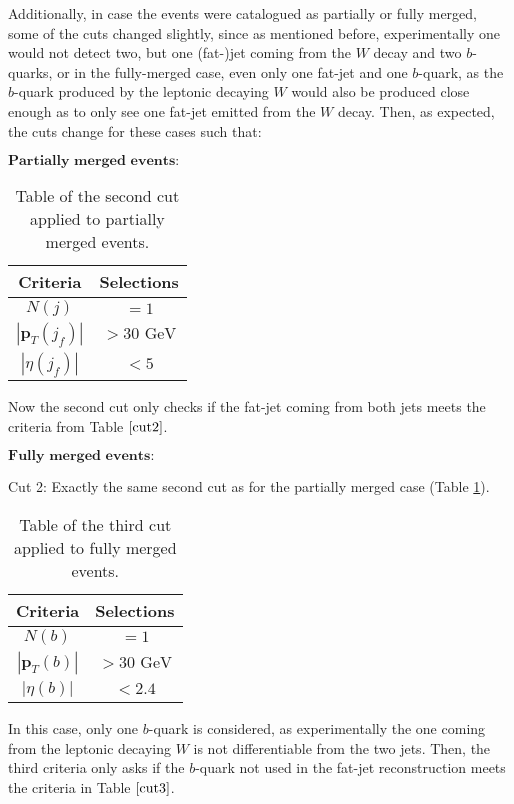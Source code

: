 Additionally, in case the events were catalogued as partially or fully merged, some of the cuts changed slightly, since as mentioned before, experimentally one would not detect two, but one (fat-)jet coming from the $W$ decay and two $b$-quarks, or in the fully-merged case, even only one fat-jet and one $b$-quark, as the $b$-quark produced by the leptonic decaying $W$ would also be produced close enough as to only see one fat-jet emitted from the $W$ decay. Then, as expected, the cuts change for these cases such that:

\vspace{0.2cm}

$\textbf{Partially merged events:}$

\begin{table}[ht!]
\centering
\caption{Table of the second cut applied to partially merged events.}
\label{cut2partially}
\begin{tabular}{cc}
\hline
\hline
 Criteria & Selections \\
\hline
 $N(j)$ & $= 1$ \\
 $|\bm{p}_T(j_f)|$ & $> 30\textrm{ GeV}$ \\
 $|\eta(j_f)|$ & $< 5$  \\
\hline
\hline
\end{tabular}
\end{table}

Now the second cut only checks if the fat-jet coming from both jets meets the criteria from Table $\ref{cut2}$.

\vspace{0.2cm}

$\textbf{Fully merged events:}$

Cut 2: Exactly the same second cut as for the partially merged case (Table \ref{cut2partially}).

\begin{table}[ht!]
\centering
\caption{Table of the third cut applied to fully merged events.}
\label{cut3fully}
\begin{tabular}{cc}
\hline
\hline
 Criteria & Selections \\
\hline
 $N(b)$ & $= 1$ \\
 $|\bm{p}_T(b)|$ & $> 30\textrm{ GeV}$ \\
 $|\eta(b)|$ & $< 2.4$  \\
\hline
\hline
\end{tabular}
\end{table}

In this case, only one $b$-quark is considered, as experimentally the one coming from the leptonic decaying $W$ is not differentiable from the two jets. Then, the third criteria only asks if the $b$-quark not used in the fat-jet reconstruction meets the criteria in Table $\ref{cut3}$.
 
